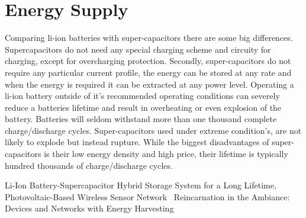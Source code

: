 \section{Energy Supply}
\label{sec:energy_supply}





Comparing li-ion batteries with super-capacitors there are some big differences.
Supercapacitors do not need any special charging scheme and circuity for charging, except for overcharging protection.
Secondly, super-capacitors do not require any particular current profile, the energy can be stored at any rate and when the energy is required it can be extracted at any power level.
Operating a li-ion battery outside of it's recommended operating conditions can severely reduce a batteries lifetime and result in overheating or even explosion of the battery.
Batteries will seldom withstand more than one thousand complete charge/discharge cycles.
Super-capacitors used under extreme condition's, are not likely to explode but instead rupture.
While the biggest disadvantages of super-capacitors is their low energy density and high price, their lifetime is typically hundred thousands of charge/discharge cycles.

Li-Ion Battery-Supercapacitor Hybrid Storage System for a Long Lifetime, Photovoltaic-Based Wireless Sensor Network~\cite{ongaro_pwre_2012}
Reincarnation in the Ambiance: Devices and Networks with Energy Harvesting \cite{prasad_comst_2014}



